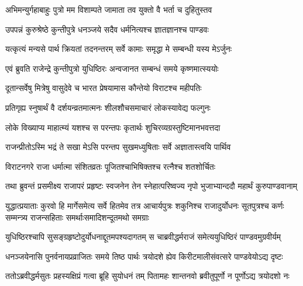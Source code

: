 \twolineshloka
{अभिमन्युर्गहाबाहुः पुत्रो मम विशाम्पते}
{जामाता तव युक्तो वै भर्ता च दुहितुस्तव}




\twolineshloka
{उपपन्नं कुरुश्रेष्ठे कुन्तीपुत्रे धनञ्जये}
{सदैव धर्मनित्यश्च ज्ञातज्ञानश्च पाण्डवः}


\twolineshloka
{यत्कृत्यं मन्यसे पार्थ क्रियतां तदनन्तरम्}
{सर्वे कामाः समृद्धा मे सम्बन्धी यस्य मेऽर्जुनः}



\twolineshloka
{एवं ब्रुवति राजेन्द्रे कुन्तीपुत्रो युधिष्ठिरः}
{अन्वजानत सम्बन्धं समये कृष्णमात्स्ययोः}


\twolineshloka
{दूतान्सर्वेषु मित्रेषु वासुदेवे च भारत}
{प्रेषयामास कौन्तेयो विराटश्च महीपतिः}



\twolineshloka
{प्रतिगृह्य स्नुषार्थं वै दर्शयन्व्रतमात्मनः}
{शीलशौचसमाचारं लोकस्यावेद्य फल्गुनः}


\twolineshloka
{लोके विख्याप्य माहात्म्यं यशश्च स परन्तपः}
{कृतार्थः शुचिरव्यग्रस्तुष्टिमानभवत्तदा}




\twolineshloka
{राजन्प्रीतोऽस्मि भद्रं ते सखा मेऽसि परन्तप}
{सुखमध्युषिताः सर्वे अज्ञातास्त्वयि पार्थिव}



\twolineshloka
{विराटनगरे राजा धर्मात्मा संशितव्रतः}
{पूजितश्चाभिषिक्तश्च रत्नैश्च शतशोर्चितः}


\twolineshloka
{तथा ब्रुवन्तं प्रसमीक्ष्य राजापरं प्रहृष्टः स्वजनेन तेन}
{स्नेहात्परिष्वज्य नृपो भुजाभ्यान्ददौ महार्थं कुरुपाण्डवानाम्}


\threelineshloka
{युद्धात्प्रयाताः कुरवो हि मार्गेसमेत्य सर्वे हितमेव तत्र}
{आचार्यपुत्रः शकुनिश्च राजादुर्योधनः सूतपुत्रश्च कर्णः}
{सम्मन्त्र्य राजन्सहिताः समर्थाःसमादिशन्दूतमथो समग्राः}


\twolineshloka
{युधिष्ठिरश्चापि सुसङ्ग्रहृष्टोदुर्योधनाद्दूतमपश्यदागतम्}
{स चाब्रवीद्धर्मराजं समेत्ययुधिष्ठिरं पाण्डवमुग्रवीर्यम्}


\twolineshloka
{धनञ्जयेनासि पुनर्वनायप्रव्राजितः समये तिष्ठ पार्थः}
{त्रयोदशे ह्येव किरीटमालीसंवत्सरे पाण्डवेयोऽद्य दृष्टः}



\twolineshloka
{ततोऽब्रवीद्धर्मसुतः प्रहस्यक्षिप्रं गत्वा ब्रूहि सुयोधनं तम्}
{पितामहः शान्तनवो ब्रवीतुपूर्णो न पूर्णोऽद्य त्रयोदशो नः}


